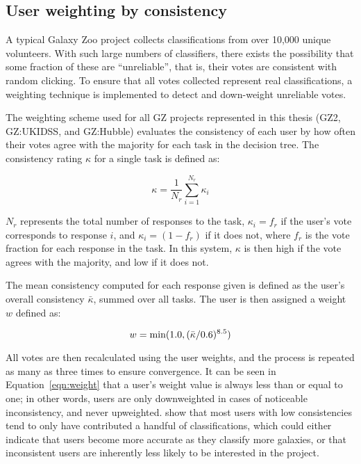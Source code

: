 \subsection{User weighting by consistency}
A typical Galaxy Zoo project collects classifications from over 10,000 unique volunteers. With such large numbers of classifiers, there exists the possibility that some fraction of these are ``unreliable'', that is, their votes are consistent with random clicking. To ensure that all votes collected represent real classifications, a weighting technique is implemented to detect and down-weight unreliable votes.

The weighting scheme used for all GZ projects represented in this thesis (GZ2, GZ:UKIDSS, and GZ:Hubble) evaluates the consistency of each user by how often their votes agree with the majority for each task in the decision tree. The consistency rating $\kappa$ for a single task is defined as:

\begin{equation}
\kappa = \frac{1}{N_{r}}\sum_{i=1}^{N_{r}}{\kappa_{i}}
\label{eqn:kappa}
\end{equation}

\noindent $N_{r}$ represents the total number of responses to the task, $\kappa_{i} = f_{r}$ if the user's vote corresponds to response $i$, and $\kappa_{i} = (1-f_{r})$ if it does not, where $f_{r}$ is the vote fraction for each response in the task. In this system, $\kappa$ is then high if the vote agrees with the majority, and low if it does not. 

The mean consistency computed for each response given is defined as the user's overall consistency $\bar{\kappa}$, summed over all tasks. The user is then assigned a weight $w$ defined as:

\begin{equation}
w = \rm min (1.0,(\bar{\kappa}/0.6)^{8.5})
\label{eqn:weight}
\end{equation}

All votes are then recalculated using the user weights, and the process is repeated as many as three times to ensure convergence. It can be seen in Equation~\ref{eqn:weight} that a user's weight value is always less than or equal to one; in other words, users are only downweighted in cases of noticeable inconsistency, and never upweighted. \citet{Willett2013} show that most users with low consistencies tend to only have contributed a handful of classifications, which could either indicate that users become more accurate as they classify more galaxies, or that inconsistent users are inherently less likely to be interested in the project. 

